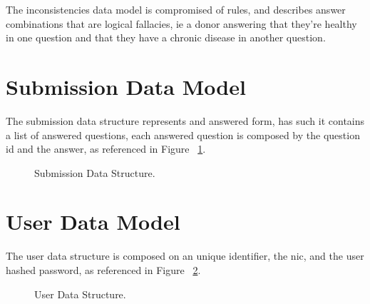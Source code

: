 The inconsistencies data model is compromised of rules, and describes answer combinations that are logical fallacies, ie a donor answering that they're healthy in one question and that they have a chronic disease in another question.

\section{Submission Data Model}

The submission data structure represents and answered form, has such it contains a list of answered questions, each answered question is composed by the question id and the answer, as referenced in Figure ~\ref{fig:submission_data_model}.

\begin{figure}[hbt!]
	\begin{center}
	\end{center}
	\caption{Submission Data Structure.}\label{fig:submission_data_model}
\end{figure}


\section{User Data Model}

The user data structure is composed on an unique identifier, the nic, and the user hashed password, as referenced in Figure ~\ref{fig:user_data_model}.

\begin{figure}[hbt!]
	\begin{center}
	\end{center}
	\caption{User Data Structure.}\label{fig:user_data_model}
\end{figure}

